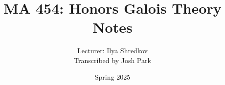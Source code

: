 \documentclass[a4paper]{article}
\title{MA 454: Honors Galois Theory Notes}
\author{Lecturer: Ilya Shredkov \\ Transcribed by Josh Park}
\date{Spring 2025}
\begin{document}
\maketitle
\tableofcontents
\pagebreak

% 
\end{document}
